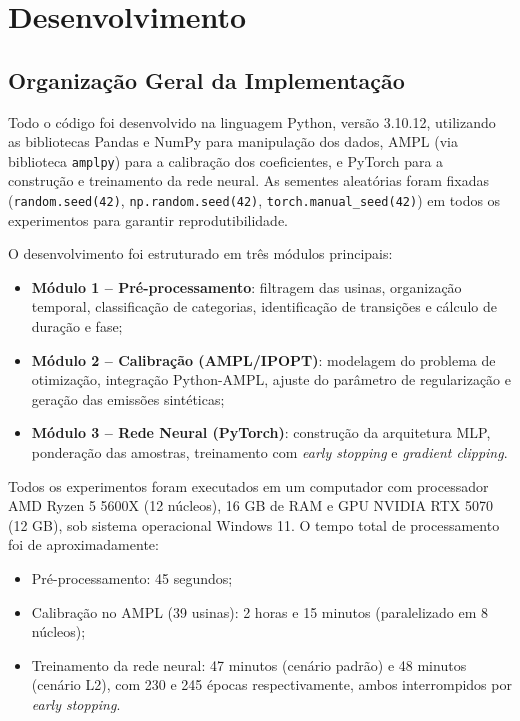 \chapter{Desenvolvimento}\label{chp:des}

\section{Organização Geral da Implementação}

Todo o código foi desenvolvido na linguagem Python, versão 3.10.12, utilizando as bibliotecas Pandas e NumPy para manipulação dos dados, \ac{AMPL} (via biblioteca \texttt{amplpy}) para a calibração dos coeficientes, e PyTorch para a construção e treinamento da rede neural. As sementes aleatórias foram fixadas (\texttt{random.seed(42)}, \texttt{np.random.seed(42)}, \texttt{torch.manual\_seed(42)}) em todos os experimentos para garantir reprodutibilidade.

O desenvolvimento foi estruturado em três módulos principais:
\begin{itemize}
    \item \textbf{Módulo 1 – Pré-processamento}: filtragem das usinas, organização temporal, classificação de categorias, identificação de transições e cálculo de duração e fase;
    \item \textbf{Módulo 2 – Calibração (\ac{AMPL}/\ac{IPOPT})}: modelagem do problema de otimização, integração Python-AMPL, ajuste do parâmetro de regularização e geração das emissões sintéticas;
    \item \textbf{Módulo 3 – Rede Neural (PyTorch)}: construção da arquitetura \ac{MLP}, ponderação das amostras, treinamento com \textit{early stopping} e \textit{gradient clipping}.
\end{itemize}

Todos os experimentos foram executados em um computador com processador AMD Ryzen 5 5600X (12 núcleos), 16 GB de RAM e GPU NVIDIA RTX 5070 (12 GB), sob sistema operacional Windows 11. O tempo total de processamento foi de aproximadamente:
\begin{itemize}
    \item Pré-processamento: 45 segundos;
    \item Calibração no \ac{AMPL} (39 usinas): 2 horas e 15 minutos (paralelizado em 8 núcleos);
    \item Treinamento da rede neural: 47 minutos (cenário padrão) e 48 minutos (cenário L2), com 230 e 245 épocas respectivamente, ambos interrompidos por \textit{early stopping}.
\end{itemize}

